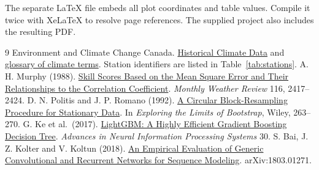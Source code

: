\documentclass[11pt,letterpaper]{article}
\begin{document}
The separate \LaTeX{} file embeds all plot coordinates and table values. Compile it twice with XeLaTeX to resolve page references. The supplied project also includes the resulting PDF.


\FloatBarrier
\begin{thebibliography}{9}\setlength{\itemsep}{2pt}
 Environment and Climate Change Canada. \href{https://climate.weather.gc.ca/}{Historical Climate Data} and \href{https://climate.weather.gc.ca/glossary_e.html}{glossary of climate terms}. Station identifiers are listed in Table~\ref{tab:stations}.
 A. H. Murphy (1988). \href{https://journals.ametsoc.org/view/journals/mwre/116/12/1520-0493_1988_116_2417_ssbotm_2_0_co_2.xml}{Skill Scores Based on the Mean Square Error and Their Relationships to the Correlation Coefficient}. \emph{Monthly Weather Review} 116, 2417--2424.
 D. N. Politis and J. P. Romano (1992). \href{https://mathweb.ucsd.edu/~politis/DPpublication.html}{A Circular Block-Resampling Procedure for Stationary Data}. In \emph{Exploring the Limits of Bootstrap}, Wiley, 263--270.
 G. Ke et al.\ (2017). \href{https://proceedings.nips.cc/paper/2017/hash/6449f44a102fde848669bdd9eb6b76fa-Abstract.html}{LightGBM: A Highly Efficient Gradient Boosting Decision Tree}. \emph{Advances in Neural Information Processing Systems} 30.
 S. Bai, J. Z. Kolter and V. Koltun (2018). \href{https://arxiv.org/abs/1803.01271}{An Empirical Evaluation of Generic Convolutional and Recurrent Networks for Sequence Modeling}. arXiv:1803.01271.
\end{thebibliography}
\end{document}
